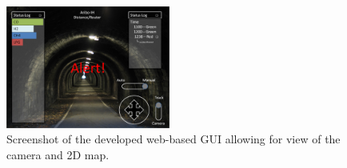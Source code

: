 \begin{figure}
	\centering
	\includegraphics[width=0.48\textwidth]{pictures/gui.png}
	\caption{Screenshot of the developed web-based GUI allowing for view of the camera and 2D map.}
	\label{fig:gui_screenshot}
\end{figure}
